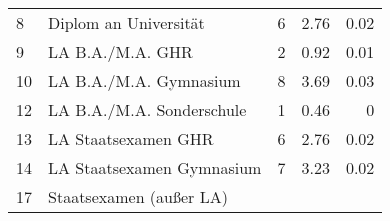 \begin{longtable}{lXrrr}
     8 &
     \multicolumn{1}{X}{ Diplom an Universität   } &


       \num{6} &
       \num[round-mode=places,round-precision=2]{2,76} &
         \num[round-mode=places,round-precision=2]{0,02} \\

     9 &
     \multicolumn{1}{X}{ LA B.A./M.A. GHR   } &


       \num{2} &
       \num[round-mode=places,round-precision=2]{0,92} &
         \num[round-mode=places,round-precision=2]{0,01} \\

     10 &
     \multicolumn{1}{X}{ LA B.A./M.A. Gymnasium   } &


       \num{8} &
       \num[round-mode=places,round-precision=2]{3,69} &
         \num[round-mode=places,round-precision=2]{0,03} \\

     12 &
     \multicolumn{1}{X}{ LA B.A./M.A. Sonderschule   } &


       \num{1} &
       \num[round-mode=places,round-precision=2]{0,46} &
         \num[round-mode=places,round-precision=2]{0} \\

     13 &
     \multicolumn{1}{X}{ LA Staatsexamen GHR   } &


       \num{6} &
       \num[round-mode=places,round-precision=2]{2,76} &
         \num[round-mode=places,round-precision=2]{0,02} \\

     14 &
     \multicolumn{1}{X}{ LA Staatsexamen Gymnasium   } &


       \num{7} &
       \num[round-mode=places,round-precision=2]{3,23} &
         \num[round-mode=places,round-precision=2]{0,02} \\

     17 &
     \multicolumn{1}{X}{ Staatsexamen (außer LA)   } &



\end{longtable}
